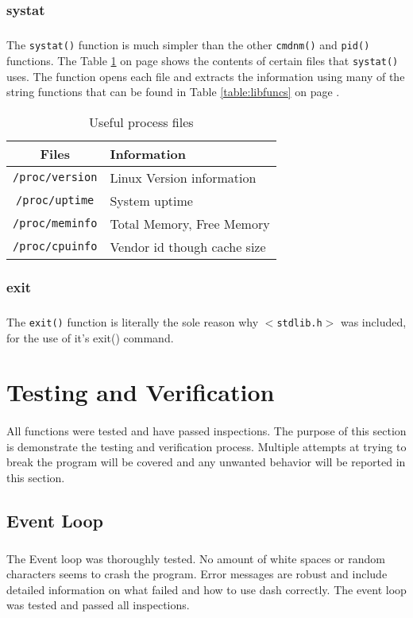 \documentclass[10pt]{article}
\begin{document}
\subsubsection{systat}
\subparagraph{}
The \texttt{systat()} function is much simpler than the other \texttt{cmdnm()} and \texttt{pid()} functions. The Table \ref{table:procFiles} on page \pageref{table:procFiles} shows the contents of certain files that \texttt{systat()} uses. The function opens each file and extracts the information using many of the string functions that can be found in Table \ref{table:libfuncs} on page \pageref{table:libfuncs}.


\begin{table}[b]
\centering
\begin{tabular}{c|l}
	Files & Information\\\hline\hline
	\texttt{/proc/version} & Linux Version information\\
	\texttt{/proc/uptime} & System uptime\\
	\texttt{/proc/meminfo} & Total Memory, Free Memory\\
	\texttt{/proc/cpuinfo} & Vendor id though cache size\\
\end{tabular}
\vspace{2mm}
\caption{Useful process files}
\label{table:procFiles}
\end{table}


\subsubsection{exit}
\subparagraph{}
The \texttt{exit()} function is literally the sole reason why \texttt{$<$stdlib.h$>$} was included, for the use of it's exit() command.


\section{Testing and Verification}
\paragraph{}
All functions were tested and have passed inspections. The purpose of this section is demonstrate the testing and verification process. Multiple attempts at trying to break the program will be covered and any unwanted behavior will be reported in this section.


\subsection{Event Loop}
\subparagraph{}
The Event loop was thoroughly tested. No amount of white spaces or random characters seems to crash the program. Error messages are robust and include detailed information on what failed and how to use dash correctly.  The event loop was tested and passed all inspections.
\end{document}
